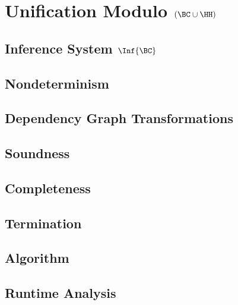 \chapter{Unification Modulo \texorpdfstring{$(\BC \cup \HH)$}{(BC U H)}}\label{chap:unif-bcuh}

\section{Inference System \texorpdfstring{$\Inf{\BC}$}{IBC}}\label{sec:inf-bc}

\section{Nondeterminism}\label{sec:nondet}

\section{Dependency Graph Transformations}\label{sec:dep-graph-trans}

\section{Soundness}\label{sec:bc-soundness}

\section{Completeness}\label{sec:bc-completeness}

\section{Termination}\label{sec:bc-termination}

\section{Algorithm}\label{sec:bc-algorithm}

\section{Runtime Analysis}\label{sec:bc-runtime-analysis}

